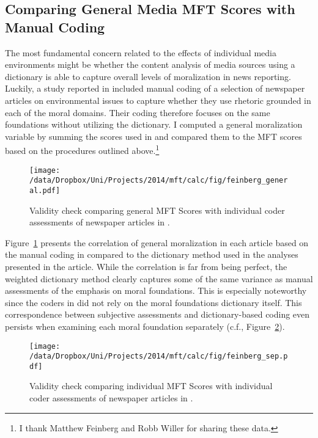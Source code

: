 \clearpage
\subsection{Comparing General Media MFT Scores with Manual Coding}

The most fundamental concern related to the effects of individual media environments might be whether the content analysis of media sources using a dictionary is able to capture overall levels of moralization in news reporting. Luckily, a study reported in \citet{feinberg2013moral} included manual coding of a selection of newspaper articles on environmental issues to capture whether they use rhetoric grounded in each of the moral domains. Their coding therefore focuses on the same foundations without utilizing the dictionary. I computed a general moralization variable by summing the scores used in \citet{feinberg2013moral} and compared them to the MFT scores based on the procedures outlined above.\footnote{I thank Matthew Feinberg and Robb Willer for sharing these data.}

\begin{figure}[ht]\centering
\texttt{[image: /data/Dropbox/Uni/Projects/2014/mft/calc/fig/feinberg\_general.pdf]}
\caption[Validity check comparing general MFT Scores with manual coding of newspaper articles]{Validity check comparing general MFT Scores with individual coder assessments of newspaper articles in \citet{feinberg2013moral}.}\label{fig:ols_feinberg}
\end{figure}

Figure~\ref{fig:ols_feinberg} presents the correlation of general moralization in each article based on the manual coding in \citet{feinberg2013moral} compared to the dictionary method used in the analyses presented in the article. While the correlation is far from being perfect, the weighted dictionary method clearly captures some of the same variance as manual assessments of the emphasis on moral foundations. This is especially noteworthy since the coders in \citet{feinberg2013moral} did not rely on the moral foundations dictionary itself. This correspondence between subjective assessments and dictionary-based coding even persists when examining each moral foundation separately (c.f., Figure~\ref{fig:ols_feinberg_sep}).


\begin{figure}[ht]\centering
\texttt{[image: /data/Dropbox/Uni/Projects/2014/mft/calc/fig/feinberg\_sep.pdf]}
\caption[Validity check comparing individual MFT Scores with manual coding of newspaper articles]{Validity check comparing individual MFT Scores with individual coder assessments of newspaper articles in \citet{feinberg2013moral}.}\label{fig:ols_feinberg_sep}
\end{figure}



